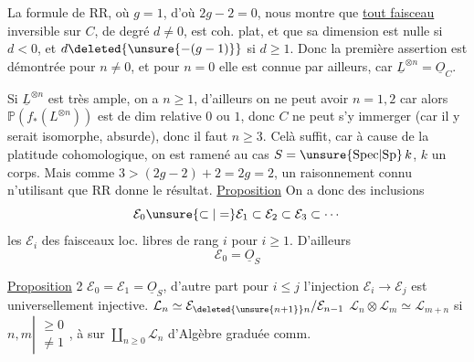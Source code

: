La formule de RR, où $g=1$, d'où $2g-2=0$, nous montre que \uline{tout faisceau}  inversible sur $C$, de degré  $d\ne0$, est coh. plat, et que sa dimension est  nulle si $d<0$, et $d\deleted{\unsure{-(g-1)}}$ si $d\geq1$. Donc la première assertion est démontrée pour $n\ne0$, et pour $n=0$ elle est connue par ailleurs, car $\underline L^{\otimes n}=\underline O_C$.

 

Si $\underline L^{\otimes n}$ est très ample, on a $n\geq1$, d'ailleurs on ne peut avoir $n=1,2$ car alors $\mathbb P(f_*(L^{\otimes n}))$ est de dim relative $0$ ou $1$, donc $C$ ne peut s'y immerger (car il y serait isomorphe, absurde), donc il faut $n\geq3$. Celà suffit, car à cause de la platitude cohomologique,   on est ramené au cas  $S=\unsure{\mathrm{Spec}|{\mathrm{Sp}}}\,k$, $k$ un corps.  Mais  comme $3>(2g-2)+2=2g=2$, un raisonnement connu n'utilisant que RR donne le résultat.
\uline{Proposition} On a donc des  inclusions
\[
\mathcal E_0\unsure{\subset|=}\mathcal E_1\subset\mathcal E_2\subset\mathcal E_3\subset\cdots
\]
les $\mathcal E_i$  des faisceaux loc. libres de rang $i$ pour $i\geq1$. D'ailleurs
\[
\mathcal E_0=\underline O_S
\]

\uline{Proposition} 2 $\mathcal E_0=\mathcal E_1=\underline O_S$, d'autre part pour $i\leq j$ l'injection $\mathcal E_i\longrightarrow\mathcal E_j$ est  universellement injective.   $\mathcal L_n\simeq\mathcal E_{\deleted{\unsure{n+1}}n}/\mathcal E_{n-1}$   $\mathcal L_n\otimes\mathcal L_m\simeq\mathcal L_{m+n}$ si $n,m\left|\begin{smallmatrix}\geq0\\\ne1\end{smallmatrix}\right.$,   à  sur $\coprod_{n\geq0}\mathcal L_n$  d'Algèbre graduée comm.

